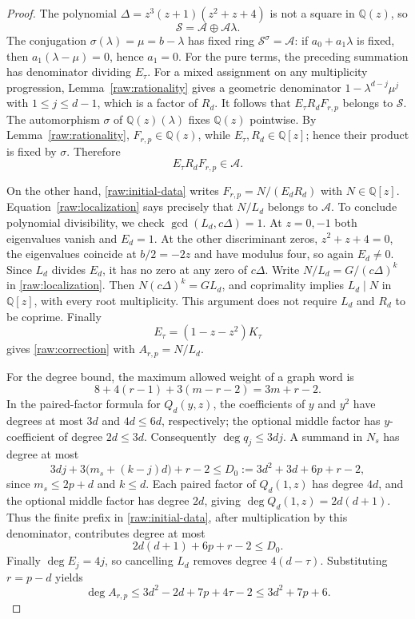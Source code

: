 \documentclass[11pt]{amsart}
\theoremstyle{definition}
\theoremstyle{remark}
\numberwithin{equation}{section}
\begin{document}
\begin{proof}
The polynomial
$\Delta=z^3(z+1)(z^2+z+4)$ is not a square in $\mathbb Q(z)$, so
\[
 \mathcal S=\mathcal A\oplus\mathcal A\lambda.
\]
The conjugation $\sigma(\lambda)=\mu=b-\lambda$ has fixed ring
$\mathcal S^\sigma=\mathcal A$: if $a_0+a_1\lambda$ is fixed, then
$a_1(\lambda-\mu)=0$, hence $a_1=0$.
For the pure terms, the preceding summation has denominator dividing
$E_\tau$.  For a mixed assignment on any multiplicity progression,
Lemma~\ref{raw:rationality} gives a geometric denominator
$1-\lambda^{d-j}\mu^j$ with $1\le j\le d-1$, which is a factor of
$R_d$.  It follows that $E_\tau R_dF_{r,p}$ belongs to $\mathcal S$.
The automorphism $\sigma$ of $\mathbb Q(z)(\lambda)$ fixes
$\mathbb Q(z)$ pointwise. By Lemma~\ref{raw:rationality},
$F_{r,p}\in\mathbb Q(z)$, while $E_\tau,R_d\in\mathbb Q[z]$;
hence their product is fixed by $\sigma$. Therefore
\begin{equation}\label{raw:localization}
 E_\tau R_dF_{r,p}\in\mathcal A.
\end{equation}

On the other hand, \eqref{raw:initial-data} writes
$F_{r,p}=N/(E_dR_d)$ with $N\in\mathbb Q[z]$.
Equation~\eqref{raw:localization} says precisely that $N/L_d$ belongs
to $\mathcal A$.  To conclude polynomial divisibility, we check
$\gcd(L_d,c\Delta)=1$.  At $z=0,-1$ both eigenvalues vanish and
$E_d=1$.  At the other discriminant zeros, $z^2+z+4=0$, the eigenvalues
coincide at $b/2=-2z$ and have modulus four, so again $E_d\ne0$.
Since $L_d$ divides $E_d$, it has no zero at any zero of $c\Delta$.
Write $N/L_d=G/(c\Delta)^k$ in \eqref{raw:localization}.  Then
$N(c\Delta)^k=GL_d$, and coprimality implies $L_d\mid N$ in
$\mathbb Q[z]$, with every root multiplicity.  This argument does not
require $L_d$ and $R_d$ to be coprime.  Finally
\[
 E_\tau=(1-z-z^2)K_\tau
\]
gives \eqref{raw:correction} with $A_{r,p}=N/L_d$.

For the degree bound, the maximum allowed weight of a graph word is
\[
 8+4(r-1)+3(m-r-2)=3m+r-2.
\]
In the paired-factor formula for $Q_d(y,z)$, the coefficients of
$y$ and $y^2$ have degrees at most $3d$ and $4d\le6d$, respectively;
the optional middle factor has $y$-coefficient of degree $2d\le3d$.
Consequently $\deg q_j\le3dj$.  A summand in $N_s$ has degree at most
\[
 3dj+3\bigl(m_s+(k-j)d\bigr)+r-2
 \le D_0:=3d^2+3d+6p+r-2,
\]
since $m_s\le2p+d$ and $k\le d$.
Each paired factor of $Q_d(1,z)$ has degree $4d$, and the optional
middle factor has degree $2d$, giving
$\deg Q_d(1,z)=2d(d+1)$.  Thus the finite prefix in
\eqref{raw:initial-data}, after multiplication by this denominator,
contributes degree at most
\[
 2d(d+1)+6p+r-2\le D_0.
\]
Finally $\deg E_j=4j$, so cancelling $L_d$ removes degree
$4(d-\tau)$.  Substituting $r=p-d$ yields
\[
 \deg A_{r,p}\le3d^2-2d+7p+4\tau-2\le3d^2+7p+6.
\]
\end{proof}
\end{document}
